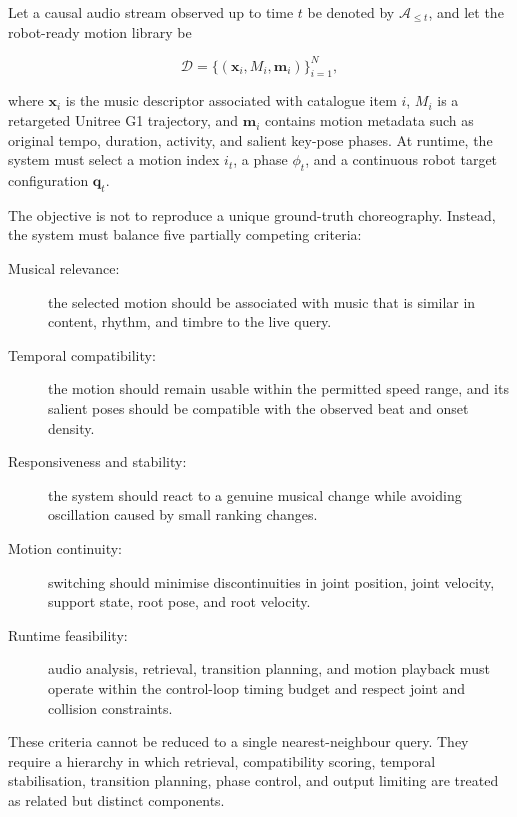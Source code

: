 Let a causal audio stream observed up to time $t$ be denoted by
$\mathcal{A}_{\leq t}$, and let the robot-ready motion library be

\begin{equation}
    \mathcal{D} = \{(\mathbf{x}_i, M_i, \mathbf{m}_i)\}_{i=1}^{N},
\end{equation}

where $\mathbf{x}_i$ is the music descriptor associated with catalogue item $i$,
$M_i$ is a retargeted Unitree G1 trajectory, and $\mathbf{m}_i$ contains motion metadata
such as original tempo, duration, activity, and salient key-pose phases. At
runtime, the system must select a motion index $i_t$, a phase $\phi_t$, and a
continuous robot target configuration $\mathbf{q}_t$.

The objective is not to reproduce a unique ground-truth choreography. Instead,
the system must balance five partially competing criteria:

\begin{description}
    \item[Musical relevance:] the selected motion should be associated with
    music that is similar in content, rhythm, and timbre to the live query.

    \item[Temporal compatibility:] the motion should remain usable within the
    permitted speed range, and its salient poses should be compatible with the
    observed beat and onset density.

    \item[Responsiveness and stability:] the system should react to a genuine
    musical change while avoiding oscillation caused by small ranking changes.

    \item[Motion continuity:] switching should minimise discontinuities in
    joint position, joint velocity, support state, root pose, and root velocity.

    \item[Runtime feasibility:] audio analysis, retrieval, transition planning,
    and motion playback must operate within the control-loop timing budget and
    respect joint and collision constraints.
\end{description}

These criteria cannot be reduced to a single nearest-neighbour query. They
require a hierarchy in which retrieval, compatibility scoring, temporal
stabilisation, transition planning, phase control, and output limiting are
treated as related but distinct components.

